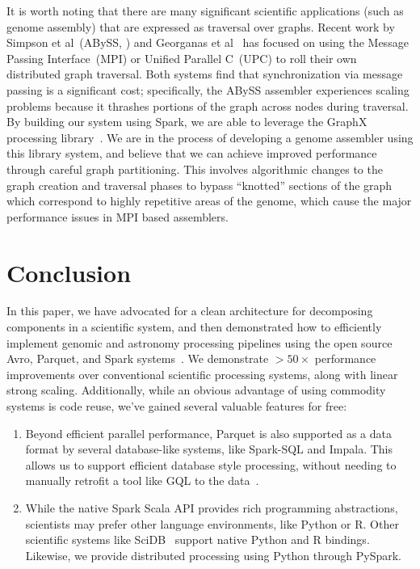 \documentclass{acm_proc_article-sp}
\begin{document}
It is worth noting that there are many significant scientific applications (such as genome
assembly) that are expressed as traversal over graphs. Recent work by Simpson et al~(ABySS,
\cite{simpson09}) and Georganas et al~\cite{georganas14} has focused on using the Message Passing
Interface~(MPI) or Unified Parallel C~(UPC) to roll their own distributed graph traversal. Both systems
find that synchronization via message passing is a significant cost; specifically, the ABySS assembler
experiences scaling problems because it thrashes portions of the graph across nodes during traversal.
By building our system using Spark, we are able to leverage the GraphX processing library~\cite{xin13}.
We are in the process of developing a genome assembler using this library system, and believe that we
can achieve improved performance through careful graph partitioning. This involves algorithmic changes
to the graph creation and traversal phases to bypass ``knotted'' sections of the graph which
correspond to highly repetitive areas of the genome, which cause the major performance issues in MPI
based assemblers.

\section{Conclusion}
\label{sec:conclusion}

In this paper, we have advocated for a clean architecture for decomposing components in a scientific
system, and then demonstrated how to efficiently implement genomic and astronomy processing
pipelines using the open source Avro, Parquet, and Spark systems~\cite{avro, parquet, zaharia10}.
We demonstrate $>50\times$ performance improvements over conventional scientific processing
systems, along with linear strong scaling. Additionally, while an obvious advantage of using commodity
systems is code reuse, we've gained several valuable features for free:

\begin{enumerate}
\item Beyond efficient parallel performance, Parquet is also supported as a data format by several
database-like systems, like Spark-SQL and Impala. This allows us to support efficient database style
processing, without needing to manually retrofit a tool like GQL to the data~\cite{kozanitis14}.
\item While the native Spark Scala API provides rich programming abstractions, scientists may prefer
other language environments, like Python or R. Other scientific systems like SciDB~\cite{brown10}
support native Python and R bindings. Likewise, we provide distributed processing using Python
through PySpark.
\end{enumerate}
\end{document}
